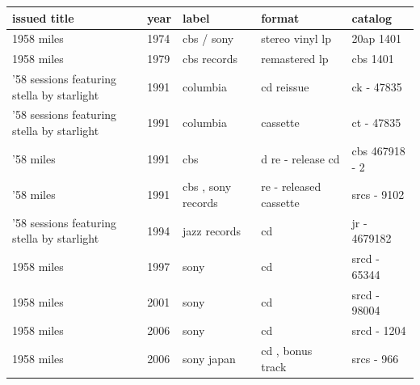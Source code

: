 \documentclass{article}
\begin{document}
\begin{tabular}{lllll}
\toprule
issued title & year & label & format & catalog \\
\midrule
1958 miles & 1974 & cbs / sony & stereo vinyl lp & 20ap 1401 \\
1958 miles & 1979 & cbs records & remastered lp & cbs 1401 \\
'58 sessions featuring stella by starlight & 1991 & columbia & cd reissue & ck - 47835 \\
'58 sessions featuring stella by starlight & 1991 & columbia & cassette & ct - 47835 \\
'58 miles & 1991 & cbs & d re - release cd & cbs 467918 - 2 \\
'58 miles & 1991 & cbs , sony records & re - released cassette & srcs - 9102 \\
'58 sessions featuring stella by starlight & 1994 & jazz records & cd & jr - 4679182 \\
1958 miles & 1997 & sony & cd & srcd - 65344 \\
1958 miles & 2001 & sony & cd & srcd - 98004 \\
1958 miles & 2006 & sony & cd & srcd - 1204 \\
1958 miles & 2006 & sony japan & cd , bonus track & srcs - 966 \\
\bottomrule
\end{tabular}
\end{document}
